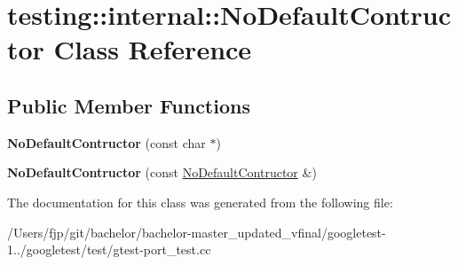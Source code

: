 \hypertarget{classtesting_1_1internal_1_1_no_default_contructor}{}\section{testing\+:\+:internal\+:\+:No\+Default\+Contructor Class Reference}
\label{classtesting_1_1internal_1_1_no_default_contructor}
\subsection*{Public Member Functions}
\begin{DoxyCompactItemize}
\item 
\mbox{\label{classtesting_1_1internal_1_1_no_default_contructor_a34c9cdf833476a9718141dcff931ba42}} 
{\bfseries No\+Default\+Contructor} (const char $\ast$)
\item 
\mbox{\label{classtesting_1_1internal_1_1_no_default_contructor_acba74b55a8c5341808ecb5b9318eaecf}} 
{\bfseries No\+Default\+Contructor} (const \mbox{\hyperlink{classtesting_1_1internal_1_1_no_default_contructor}{No\+Default\+Contructor}} \&)
\end{DoxyCompactItemize}


The documentation for this class was generated from the following file\+:\begin{DoxyCompactItemize}
\item 
/\+Users/fjp/git/bachelor/bachelor-\/master\+\_\+updated\+\_\+vfinal/googletest-\/1../googletest/test/gtest-\/port\+\_\+test.\+cc\end{DoxyCompactItemize}
